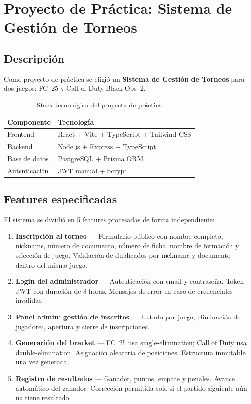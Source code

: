 \documentclass[12pt, a4paper]{report}
\begin{document}
\chapter{Proyecto de Pr\'actica: Sistema de Gesti\'on de Torneos}

\section{Descripci\'on}

Como proyecto de pr\'actica se eligi\'o un \textbf{Sistema de Gesti\'on de
Torneos} para dos juegos: FC~25 y Call of Duty Black Ops~2.

\begin{table}[H]
\centering
\begin{tabularx}{\textwidth}{lX}
\toprule
\textbf{Componente} & \textbf{Tecnolog\'ia} \\
\midrule
Frontend      & React + Vite + TypeScript + Tailwind CSS \\
Backend       & Node.js + Express + TypeScript \\
Base de datos & PostgreSQL + Prisma ORM \\
Autenticaci\'on & JWT manual + bcrypt \\
\bottomrule
\end{tabularx}
\caption{Stack tecnol\'ogico del proyecto de pr\'actica}
\end{table}

\section{Features especificadas}

El sistema se dividi\'o en 5 features procesadas de forma independiente:

\begin{enumerate}[leftmargin=*, label=\textbf{F\arabic{*}.}]
  \item \textbf{Inscripci\'on al torneo} --- Formulario p\'ublico con nombre
        completo, nickname, n\'umero de documento, n\'umero de ficha, nombre
        de formaci\'on y selecci\'on de juego. Validaci\'on de duplicados por
        nickname y documento dentro del mismo juego.
  \item \textbf{Login del administrador} --- Autenticaci\'on con email y
        contrase\~na. Token JWT con duraci\'on de 8 horas. Mensajes de error
        en caso de credenciales inv\'alidas.
  \item \textbf{Panel admin: gesti\'on de inscritos} --- Listado por juego,
        eliminaci\'on de jugadores, apertura y cierre de inscripciones.
  \item \textbf{Generaci\'on del bracket} --- FC~25 usa single-elimination;
        Call of Duty usa double-elimination. Asignaci\'on aleatoria de
        posiciones. Estructura inmutable una vez generada.
  \item \textbf{Registro de resultados} --- Ganador, puntos, empate y penales.
        Avance autom\'atico del ganador. Correcci\'on permitida solo si el
        partido siguiente a\'un no tiene resultado.
\end{enumerate}
\end{document}
